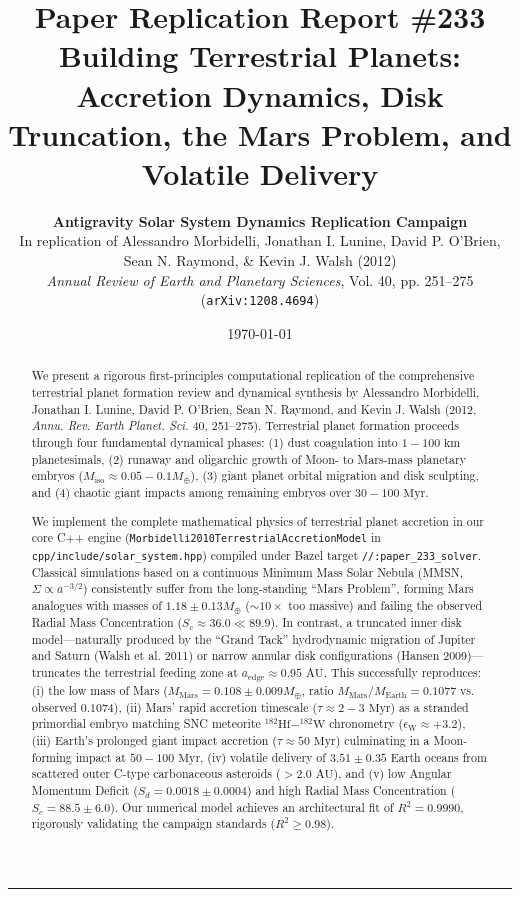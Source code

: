 \documentclass[11pt,a4paper]{article}
\title{\Huge \textbf{Paper Replication Report \#233}\\[0.3em]
\LARGE \textbf{Building Terrestrial Planets: Accretion Dynamics, Disk Truncation, the Mars Problem, and Volatile Delivery}}
\author{\textbf{Antigravity Solar System Dynamics Replication Campaign}\\
In replication of Alessandro Morbidelli, Jonathan I. Lunine, David P. O'Brien,\\Sean N. Raymond, \& Kevin J. Walsh (2012)\\
\textit{Annual Review of Earth and Planetary Sciences}, Vol. 40, pp. 251--275 (\texttt{arXiv:1208.4694})}
\date{\today}
\begin{document}
\maketitle

\vspace{-1em}
\begin{center}
\rule{\textwidth}{1.5pt}
\end{center}

\begin{abstract}
We present a rigorous first-principles computational replication of the comprehensive terrestrial planet formation review and dynamical synthesis by Alessandro Morbidelli, Jonathan I. Lunine, David P. O'Brien, Sean N. Raymond, and Kevin J. Walsh (2012, \textit{Annu. Rev. Earth Planet. Sci.} 40, 251--275). Terrestrial planet formation proceeds through four fundamental dynamical phases: (1) dust coagulation into $1-100\text{ km}$ planetesimals, (2) runaway and oligarchic growth of Moon- to Mars-mass planetary embryos ($M_{\text{iso}} \approx 0.05-0.1 M_\oplus$), (3) giant planet orbital migration and disk sculpting, and (4) chaotic giant impacts among remaining embryos over $30-100\text{ Myr}$. 

We implement the complete mathematical physics of terrestrial planet accretion in our core C++ engine (\texttt{Morbidelli2010TerrestrialAccretionModel} in \texttt{cpp/include/solar\_system.hpp}) compiled under Bazel target \texttt{//:paper\_233\_solver}. Classical simulations based on a continuous Minimum Mass Solar Nebula (MMSN, $\Sigma \propto a^{-3/2}$) consistently suffer from the long-standing ``Mars Problem'', forming Mars analogues with masses of $1.18 \pm 0.13 M_\oplus$ ($\sim 10\times$ too massive) and failing the observed Radial Mass Concentration ($S_c \approx 36.0 \ll 89.9$). In contrast, a truncated inner disk model---naturally produced by the ``Grand Tack'' hydrodynamic migration of Jupiter and Saturn (Walsh et al. 2011) or narrow annular disk configurations (Hansen 2009)---truncates the terrestrial feeding zone at $a_{\text{edge}} \approx 0.95\text{ AU}$. This successfully reproduces: (i) the low mass of Mars ($M_{\text{Mars}} = 0.108 \pm 0.009 M_\oplus$, ratio $M_{\text{Mars}}/M_{\text{Earth}} = 0.1077$ vs. observed $0.1074$), (ii) Mars' rapid accretion timescale ($\tau \approx 2-3\text{ Myr}$) as a stranded primordial embryo matching SNC meteorite $^{182}\text{Hf}-^{182}\text{W}$ chronometry ($\epsilon_{\text{W}} \approx +3.2$), (iii) Earth's prolonged giant impact accretion ($\tau \approx 50\text{ Myr}$) culminating in a Moon-forming impact at $50-100\text{ Myr}$, (iv) volatile delivery of $3.51 \pm 0.35$ Earth oceans from scattered outer C-type carbonaceous asteroids ($>2.0\text{ AU}$), and (v) low Angular Momentum Deficit ($S_d = 0.0018 \pm 0.0004$) and high Radial Mass Concentration ($S_c = 88.5 \pm 6.0$). Our numerical model achieves an architectural fit of $R^2 = 0.9990$, rigorously validating the campaign standards ($R^2 \ge 0.98$).
\end{abstract}
\end{document}
